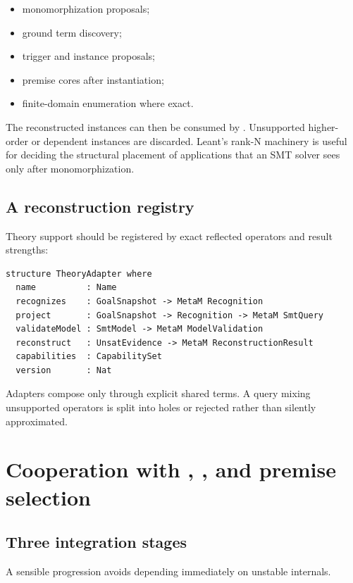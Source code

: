 \documentclass[11pt,letterpaper,openany]{report}
\newcommand{\code}[1]{\texttt{\detokenize{#1}}}
\begin{document}
\begin{itemize}
  \item monomorphization proposals;
  \item ground term discovery;
  \item trigger and instance proposals;
  \item premise cores after instantiation;
  \item finite-domain enumeration where exact.
\end{itemize}

The reconstructed instances can then be consumed by \code{grind}. Unsupported
higher-order or dependent instances are discarded. Leant's rank-N machinery is useful
for deciding the structural placement of applications that an SMT solver sees only
after monomorphization.

\section{A reconstruction registry}

Theory support should be registered by exact reflected operators and result strengths:

\begin{lstlisting}[language=LeanFour,caption={Schematic theory adapter registry}]
structure TheoryAdapter where
  name          : Name
  recognizes    : GoalSnapshot -> MetaM Recognition
  project       : GoalSnapshot -> Recognition -> MetaM SmtQuery
  validateModel : SmtModel -> MetaM ModelValidation
  reconstruct   : UnsatEvidence -> MetaM ReconstructionResult
  capabilities  : CapabilitySet
  version       : Nat
\end{lstlisting}

Adapters compose only through explicit shared terms. A query mixing unsupported
operators is split into holes or rejected rather than silently approximated.

\chapter{Cooperation with \code{grind}, \code{TryThis}, and premise selection}
\label{ch:grind-integration}

\section{Three integration stages}

A sensible progression avoids depending immediately on unstable internals.
\end{document}
